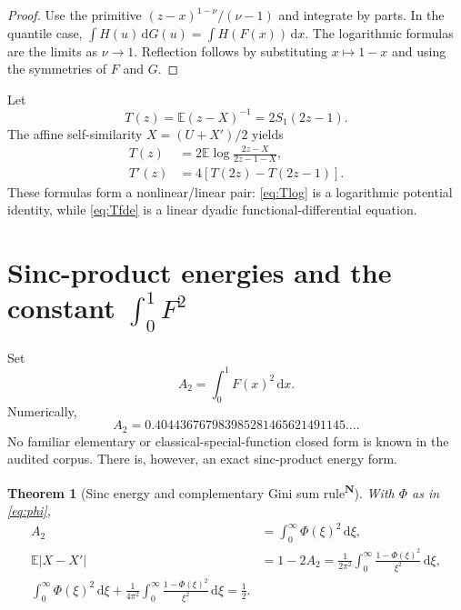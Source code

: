 \documentclass[11pt,oneside]{article}
\newtheorem{theorem}{Theorem}[section]
\theoremstyle{definition}
\theoremstyle{remark}
\newcommand{\F}{F}
\newcommand{\G}{G}
\newcommand{\E}{\mathbb E}
\newcommand{\dd}{\,\mathrm d}
\newcommand{\tagnew}{\textsuperscript{\textcolor{oliveink}{\bfseries N}}}
\begin{document}
\begin{proof}
Use the primitive
\((z-x)^{1-\nu}/(\nu-1)\) and integrate by parts.  In the quantile case,
\(\int H(u)\dd\G(u)=\int H(\F(x))\dd x\).  The logarithmic formulas are the
limits as \(\nu\to1\).  Reflection follows by substituting \(x\mapsto1-x\) and
using the symmetries of \(\F\) and \(\G\).
\end{proof}

Let
\begin{equation}\label{eq:Tdef}
 T(z)=\E(z-X)^{-1}=2S_1(2z-1).
\end{equation}
The affine self-similarity \(X=(U+X')/2\) yields
\begin{align}
 T(z)&=2\E\log\frac{2z-X}{2z-1-X},\label{eq:Tlog}\\
 T'(z)&=4[T(2z)-T(2z-1)].\label{eq:Tfde}
\end{align}
These formulas form a nonlinear/linear pair: \eqref{eq:Tlog} is a logarithmic
potential identity, while \eqref{eq:Tfde} is a linear dyadic
functional-differential equation.

\section{Sinc-product energies and the constant \(\int_0^1\F^2\)}

Set
\begin{equation}
 A_2=\int_0^1\F(x)^2\dd x.
\end{equation}
Numerically,
\begin{equation}\label{eq:A2numeric}
 A_2=0.404436767983985281465621491145\ldots.
\end{equation}
No familiar elementary or classical-special-function closed form is known in
the audited corpus.  There is, however, an exact sinc-product energy form.

\begin{theorem}[Sinc energy and complementary Gini sum rule\tagnew]
With \(\Phi\) as in \eqref{eq:phi},
\begin{align}
 A_2&=\int_0^\infty\Phi(\xi)^2\dd\xi,\label{eq:A2Phi}\\
 \E|X-X'|&=1-2A_2
 =\frac1{2\pi^2}\int_0^\infty
 \frac{1-\Phi(\xi)^2}{\xi^2}\dd\xi,\label{eq:GiniPhi}\\
 \boxed{
 \int_0^\infty\Phi(\xi)^2\dd\xi
 +\frac1{4\pi^2}\int_0^\infty
 \frac{1-\Phi(\xi)^2}{\xi^2}\dd\xi=\frac12.}
 \label{eq:sumrule}
\end{align}
\end{theorem}
\end{document}
